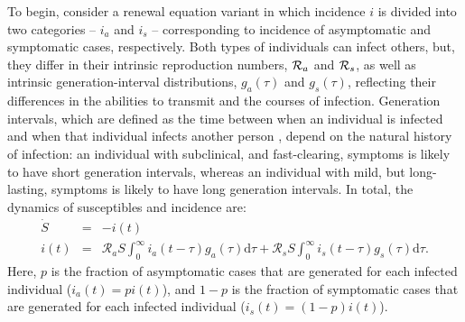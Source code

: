 To begin, consider a renewal equation variant in which incidence $i$ is divided into two categories -- $i_a$ and $i_s$ -- corresponding to incidence of asymptomatic and symptomatic cases, respectively. 
Both types of individuals can infect others, but, they differ in their intrinsic reproduction numbers, ${\cal{R}}_a$ and ${\cal{R}}_s$, as well as intrinsic generation-interval distributions, $g_a(\tau)$ and $g_s(\tau)$, reflecting their differences in the abilities to transmit and the courses of infection.
Generation intervals, which are defined as the time between when an individual is infected and when that individual infects another person \citep{svensson2007note}, depend on the natural history of infection:
an individual with subclinical, and fast-clearing, symptoms is likely to have short generation intervals, whereas an individual with mild, but long-lasting, symptoms is likely to have long generation intervals.
In total, the dynamics of susceptibles and incidence are:
\begin{eqnarray}
\dot{S}&=&-i(t) \\
i(t)&=&\mathcal R_a S \int_0^\infty i_a(t-\tau) g_a(\tau) \mathrm{d}\tau + \mathcal R_s S \int_0^\infty i_s(t-\tau) g_s(\tau) \mathrm{d}\tau.
\end{eqnarray}
Here, $p$ is the fraction of asymptomatic cases that are generated for each infected individual ($i_a(t)= p i(t)$), and $1-p$ is the fraction of symptomatic cases that are generated for each infected individual ($i_s(t)= (1-p) i(t)$).


